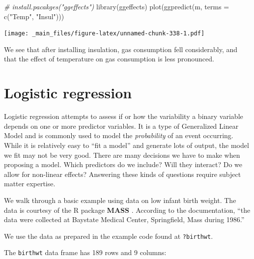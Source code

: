 \documentclass[
]{book}
\newenvironment{Shaded}{\begin{snugshade}}{\end{snugshade}}
\newcommand{\AttributeTok}[1]{\textcolor[rgb]{0.77,0.63,0.00}{#1}}
\newcommand{\CommentTok}[1]{\textcolor[rgb]{0.56,0.35,0.01}{\textit{#1}}}
\newcommand{\FunctionTok}[1]{\textcolor[rgb]{0.00,0.00,0.00}{#1}}
\newcommand{\NormalTok}[1]{#1}
\newcommand{\StringTok}[1]{\textcolor[rgb]{0.31,0.60,0.02}{#1}}
\begin{document}
\begin{Shaded}
\begin{Highlighting}[]
\CommentTok{\# install.pacakges("ggeffects")}
\FunctionTok{library}\NormalTok{(ggeffects)}
\FunctionTok{plot}\NormalTok{(}\FunctionTok{ggpredict}\NormalTok{(m, }\AttributeTok{terms =} \FunctionTok{c}\NormalTok{(}\StringTok{"Temp"}\NormalTok{, }\StringTok{"Insul"}\NormalTok{)))}
\end{Highlighting}
\end{Shaded}

\texttt{[image: \_main\_files/figure-latex/unnamed-chunk-338-1.pdf]}

We see that after installing insulation, gas consumption fell considerably, and that the effect of temperature on gas consumption is less pronounced.

\hypertarget{logistic-regression}{%
\section{Logistic regression}\label{logistic-regression}}

Logistic regression attempts to assess if or how the variability a binary variable depends on one or more predictor variables. It is a type of Generalized Linear Model and is commonly used to model the \emph{probability} of an event occurring. While it is relatively easy to ``fit a model'' and generate lots of output, the model we fit may not be very good. There are many decisions we have to make when proposing a model. Which predictors do we include? Will they interact? Do we allow for non-linear effects? Answering these kinds of questions require subject matter expertise.

We walk through a basic example using data on low infant birth weight. The data is courtesy of the R package \textbf{MASS} \citep{MASS}. According to the documentation, ``the data were collected at Baystate Medical Center, Springfield, Mass during 1986.''

We use the data as prepared in the example code found at \texttt{?birthwt}.

The \texttt{birthwt} data frame has 189 rows and 9 columns:
\end{document}
